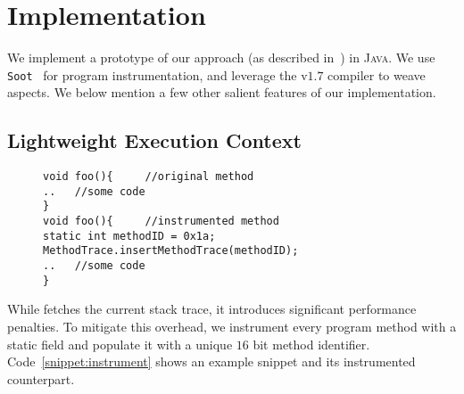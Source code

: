 \section{Implementation}
\label{sec:implementation}


We implement a prototype of our approach (as described in~) 
in \textsc{Java}. We use \texttt{Soot}~\cite{soot} for program instrumentation, 
and leverage the  v$1.7$ compiler to weave aspects. We below mention a 
few other salient features of our implementation. 


% 

\subsection{Lightweight Execution Context}
\label{subsec:trace}

 \begin{figure}[t]
\begin{lstlisting}
void foo(){		//original method
..   //some code
}
void foo(){		//instrumented method
static int methodID = 0x1a;
MethodTrace.insertMethodTrace(methodID);
..   //some code
}
\end{lstlisting}
\end{figure}

While  fetches the current stack trace, it introduces 
significant performance penalties. To mitigate this overhead, we instrument 
every program method with a static  field and populate it with a 
unique $16$ bit method identifier. Code~\ref{snippet:instrument} shows an 
example snippet and its instrumented counterpart.
% 
% 

